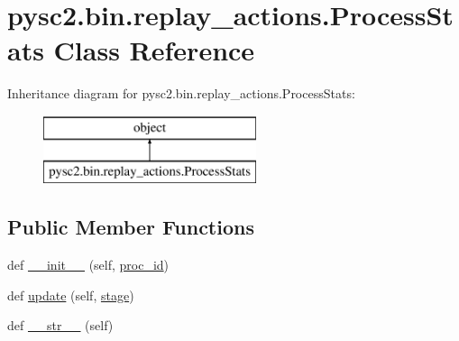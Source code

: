\hypertarget{classpysc2_1_1bin_1_1replay__actions_1_1_process_stats}{}\section{pysc2.\+bin.\+replay\+\_\+actions.\+Process\+Stats Class Reference}
\label{classpysc2_1_1bin_1_1replay__actions_1_1_process_stats}
Inheritance diagram for pysc2.\+bin.\+replay\+\_\+actions.\+Process\+Stats\+:\begin{figure}[H]
\begin{center}
\leavevmode
\includegraphics[height=2.000000cm]{classpysc2_1_1bin_1_1replay__actions_1_1_process_stats}
\end{center}
\end{figure}
\subsection*{Public Member Functions}
\begin{DoxyCompactItemize}
\item 
def \mbox{\hyperlink{classpysc2_1_1bin_1_1replay__actions_1_1_process_stats_ab0ce6dc1c085905ac44fa0a957d12244}{\+\_\+\+\_\+init\+\_\+\+\_\+}} (self, \mbox{\hyperlink{classpysc2_1_1bin_1_1replay__actions_1_1_process_stats_a1853b4ef019491644bea9cc55db42654}{proc\+\_\+id}})
\item 
def \mbox{\hyperlink{classpysc2_1_1bin_1_1replay__actions_1_1_process_stats_a13ecf7bc2e1b648f0ddf2d1f00107927}{update}} (self, \mbox{\hyperlink{classpysc2_1_1bin_1_1replay__actions_1_1_process_stats_a57e9ffbecc64afaa3159edf73f548f23}{stage}})
\item 
def \mbox{\hyperlink{classpysc2_1_1bin_1_1replay__actions_1_1_process_stats_a6de9fd2b9a20717fd68f31d1efc5cb46}{\+\_\+\+\_\+str\+\_\+\+\_\+}} (self)
\end{DoxyCompactItemize}
